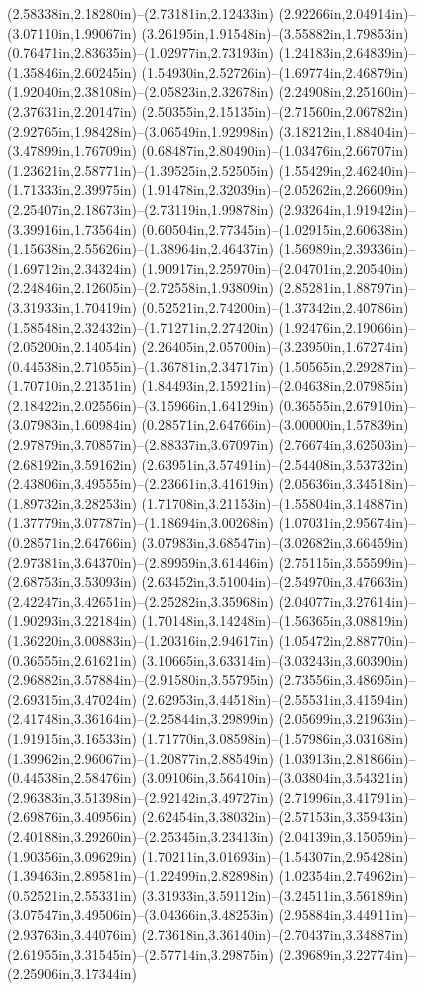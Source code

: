 (2.58338in,2.18280in)--(2.73181in,2.12433in) (2.92266in,2.04914in)--(3.07110in,1.99067in) (3.26195in,1.91548in)--(3.55882in,1.79853in) (0.76471in,2.83635in)--(1.02977in,2.73193in) (1.24183in,2.64839in)--(1.35846in,2.60245in) (1.54930in,2.52726in)--(1.69774in,2.46879in) (1.92040in,2.38108in)--(2.05823in,2.32678in) (2.24908in,2.25160in)--(2.37631in,2.20147in) (2.50355in,2.15135in)--(2.71560in,2.06782in) (2.92765in,1.98428in)--(3.06549in,1.92998in) (3.18212in,1.88404in)--(3.47899in,1.76709in) (0.68487in,2.80490in)--(1.03476in,2.66707in) (1.23621in,2.58771in)--(1.39525in,2.52505in) (1.55429in,2.46240in)--(1.71333in,2.39975in) (1.91478in,2.32039in)--(2.05262in,2.26609in) (2.25407in,2.18673in)--(2.73119in,1.99878in) (2.93264in,1.91942in)--(3.39916in,1.73564in) (0.60504in,2.77345in)--(1.02915in,2.60638in) (1.15638in,2.55626in)--(1.38964in,2.46437in) (1.56989in,2.39336in)--(1.69712in,2.34324in) (1.90917in,2.25970in)--(2.04701in,2.20540in) (2.24846in,2.12605in)--(2.72558in,1.93809in) (2.85281in,1.88797in)--(3.31933in,1.70419in) (0.52521in,2.74200in)--(1.37342in,2.40786in) (1.58548in,2.32432in)--(1.71271in,2.27420in) (1.92476in,2.19066in)--(2.05200in,2.14054in) (2.26405in,2.05700in)--(3.23950in,1.67274in) (0.44538in,2.71055in)--(1.36781in,2.34717in) (1.50565in,2.29287in)--(1.70710in,2.21351in) (1.84493in,2.15921in)--(2.04638in,2.07985in) (2.18422in,2.02556in)--(3.15966in,1.64129in) (0.36555in,2.67910in)--(3.07983in,1.60984in) (0.28571in,2.64766in)--(3.00000in,1.57839in) (2.97879in,3.70857in)--(2.88337in,3.67097in) (2.76674in,3.62503in)--(2.68192in,3.59162in) (2.63951in,3.57491in)--(2.54408in,3.53732in) (2.43806in,3.49555in)--(2.23661in,3.41619in) (2.05636in,3.34518in)--(1.89732in,3.28253in) (1.71708in,3.21153in)--(1.55804in,3.14887in) (1.37779in,3.07787in)--(1.18694in,3.00268in) (1.07031in,2.95674in)--(0.28571in,2.64766in) (3.07983in,3.68547in)--(3.02682in,3.66459in) (2.97381in,3.64370in)--(2.89959in,3.61446in) (2.75115in,3.55599in)--(2.68753in,3.53093in) (2.63452in,3.51004in)--(2.54970in,3.47663in) (2.42247in,3.42651in)--(2.25282in,3.35968in) (2.04077in,3.27614in)--(1.90293in,3.22184in) (1.70148in,3.14248in)--(1.56365in,3.08819in) (1.36220in,3.00883in)--(1.20316in,2.94617in) (1.05472in,2.88770in)--(0.36555in,2.61621in) (3.10665in,3.63314in)--(3.03243in,3.60390in) (2.96882in,3.57884in)--(2.91580in,3.55795in) (2.73556in,3.48695in)--(2.69315in,3.47024in) (2.62953in,3.44518in)--(2.55531in,3.41594in) (2.41748in,3.36164in)--(2.25844in,3.29899in) (2.05699in,3.21963in)--(1.91915in,3.16533in) (1.71770in,3.08598in)--(1.57986in,3.03168in) (1.39962in,2.96067in)--(1.20877in,2.88549in) (1.03913in,2.81866in)--(0.44538in,2.58476in) (3.09106in,3.56410in)--(3.03804in,3.54321in) (2.96383in,3.51398in)--(2.92142in,3.49727in) (2.71996in,3.41791in)--(2.69876in,3.40956in) (2.62454in,3.38032in)--(2.57153in,3.35943in) (2.40188in,3.29260in)--(2.25345in,3.23413in) (2.04139in,3.15059in)--(1.90356in,3.09629in) (1.70211in,3.01693in)--(1.54307in,2.95428in) (1.39463in,2.89581in)--(1.22499in,2.82898in) (1.02354in,2.74962in)--(0.52521in,2.55331in) (3.31933in,3.59112in)--(3.24511in,3.56189in) (3.07547in,3.49506in)--(3.04366in,3.48253in) (2.95884in,3.44911in)--(2.93763in,3.44076in) (2.73618in,3.36140in)--(2.70437in,3.34887in) (2.61955in,3.31545in)--(2.57714in,3.29875in) (2.39689in,3.22774in)--(2.25906in,3.17344in) 